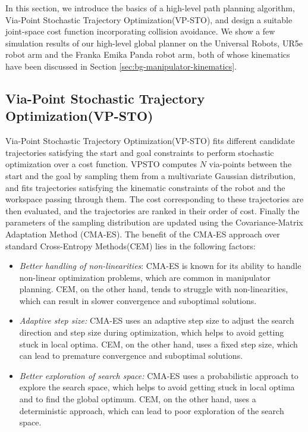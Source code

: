 In this section, we introduce the basics of a high-level path planning algorithm, Via-Point Stochastic Trajectory Optimization(VP-STO)\cite{VPSTO}, and design a suitable joint-space cost function incorporating collision avoidance. We show a few simulation results of our high-level global planner on the Universal Robots, UR5e robot arm and the Franka Emika Panda robot arm, both of whose kinematics have been discussed in Section \ref{sec:bg-manipulator-kinematics}.


\subsection{Via-Point Stochastic Trajectory Optimization(VP-STO)}

Via-Point Stochastic Trajectory Optimization(VP-STO)\cite{VPSTO} fits different candidate trajectories satisfying the start and goal constraints to perform stochastic optimization over a cost function. VPSTO computes $N$ via-points between the start and the goal by sampling them from a multivariate Gaussian distribution, and fits trajectories satisfying the kinematic constraints of the robot and the workspace passing through them. The cost corresponding to these trajectories are then evaluated, and the trajectories are ranked in their order of cost. Finally the parameters of the sampling distribution are updated using the Covariance-Matrix Adaptation Method (CMA-ES). The benefit of the CMA-ES approach over standard Cross-Entropy Methods(CEM) lies in the following factors:

\begin{itemize}
    \item \textit{Better handling of non-linearities}: CMA-ES is known for its ability to handle non-linear optimization problems, which are common in manipulator planning. CEM, on the other hand, tends to struggle with non-linearities, which can result in slower convergence and suboptimal solutions.
    \item \textit{Adaptive step size:} CMA-ES uses an adaptive step size to adjust the search direction and step size during optimization, which helps to avoid getting stuck in local optima. CEM, on the other hand, uses a fixed step size, which can lead to premature convergence and suboptimal solutions.
    \item \textit{Better exploration of search space:}  CMA-ES uses a probabilistic approach to explore the search space, which helps to avoid getting stuck in local optima and to find the global optimum. CEM, on the other hand, uses a deterministic approach, which can lead to poor exploration of the search space.
\end{itemize}

